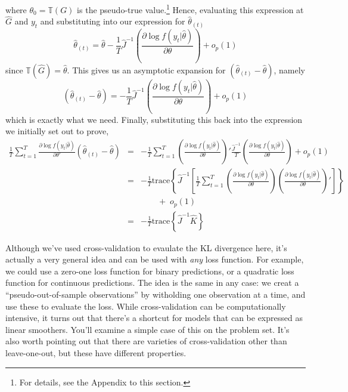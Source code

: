 \documentclass[12pt]{article}
\theoremstyle{definition}
\begin{document}
where $\theta_0 = \mathbb{T}(G)$ is the pseudo-true value.\footnote{For details, see the Appendix to this section.} Hence, evaluating this expression at $\widehat{G}$ and $y_t$ and substituting into our expression for $\widehat{\theta}_{(t)}$
	$$\widehat{\theta}_{(t)} = \widehat{\theta} - \frac{1}{T}\widehat{J}^{-1} \left(\frac{\partial \log f(y_t|\widehat{\theta})}{\partial \theta}\right) + o_p(1)$$
since $\mathbb{T}(\widehat{G}) = \widehat{\theta}$. This gives us an asymptotic expansion for $\left(\widehat{\theta}_{(t)} - \widehat{\theta}\right)$, namely 
$$\left(\widehat{\theta}_{(t)} - \widehat{\theta}\right) =  - \frac{1}{T}\widehat{J}^{-1} \left(\frac{\partial \log f(y_t|\widehat{\theta})}{\partial \theta}\right) + o_p(1)$$
which is exactly what we need. Finally, substituting this back into the expression we initially set out to prove,
\begin{eqnarray*}
	\frac{1}{T}\sum_{t=1}^T \frac{\partial \log f(y_t|\widehat{\theta})}{\partial \theta'}\left(\widehat{\theta}_{(t)} - \widehat{\theta} \right) &=& -\frac{1}{T}\sum_{t=1}^T \left(\frac{\partial \log f(y_t|\widehat{\theta})}{\partial \theta}\right)' \frac{\widehat{J}^{-1}}{T}\left(\frac{\partial \log f(y_t|\widehat{\theta})}{\partial \theta}\right) + o_p(1)\\
		&=& -\frac{1}{T}\mbox{trace}\left\{\widehat{J}^{-1}\left[\frac{1}{T}\sum_{t=1}^T \left(\frac{\partial \log f(y_t|\widehat{\theta})}{\partial \theta}\right) \left(\frac{\partial \log f(y_t|\widehat{\theta})}{\partial \theta}\right) '\right]\right\}\\
		&&\quad \quad + \; o_p(1)\\
		&=&-\frac{1}{T}\mbox{trace}\left\{\widehat{J}^{-1} \widehat{K} \right\}
\end{eqnarray*}



Although we've used cross-validation to evaulate the KL divergence here, it's actually a very general idea and can be used with \emph{any} loss function. For example, we could use a zero-one loss function for binary predictions, or a quadratic loss function for continuous predictions. The idea is the same in any case: we creat a ``pseudo-out-of-sample observations'' by witholding one observation at a time, and use these to evaluate the loss. While cross-validation can be computationally intensive, it turns out that there's a shortcut for models that can be expressed as linear smoothers. You'll examine a simple case of this on the problem set. It's also worth pointing out that there are varieties of cross-validation other than leave-one-out, but these have different properties. 
\end{document}
